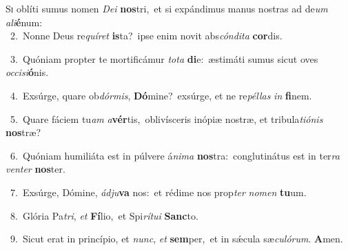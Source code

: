 \lettrine{\initial\textcolor{\initialcolor}{S}}{i} oblíti sumus nomen \textit{De}\-\textit{i} \textbf{nos}\-tri,~\star et si expándimus manus nostras ad de\textit{um} \textit{a}\-\textit{li}\textbf{é}num:\\
{\numbfont\textcolor{\numbcolor}{~2.}}~Nonne Deus re\-\textit{quí}\-\textit{ret} \textbf{is}\-ta?~\star ipse enim novit abs\-\textit{cón}\-\textit{di}\textit{ta} \textbf{cor}\-dis.\par
{\numbfont\textcolor{\numbcolor}{~3.}}~Quóniam propter te mortificámur \textit{to}\-\textit{ta} \textbf{di}\-e:~\star æstimáti sumus sicut oves \textit{oc}\-\textit{ci}\textit{si}\textbf{ó}nis.\par
{\numbfont\textcolor{\numbcolor}{~4.}}~Exsúrge, quare ob\-\textit{dór}\-\textit{mis}, \textbf{Dó}\-mine?~\star exsúrge, et ne re\-\textit{pél}\-\textit{las} \textit{in} \textbf{fi}\-nem.\par
{\numbfont\textcolor{\numbcolor}{~5.}}~Quare fáciem tu\textit{am} \textit{a}\-\textbf{vér}tis,~\star oblivísceris inópiæ nostræ, et tribula\-\textit{ti}\-\textit{ó}\textit{nis} \textbf{nos}\-træ?\par
{\numbfont\textcolor{\numbcolor}{~6.}}~Quóniam humiliáta est in púlvere á\-\textit{ni}\-\textit{ma} \textbf{nos}\-tra:~\star conglutinátus est in ter\textit{ra} \textit{ven}\-\textit{ter} \textbf{nos}\-ter.\par
{\numbfont\textcolor{\numbcolor}{~7.}}~Exsúrge, Dómine, \textit{ád}\-\textit{ju}\textbf{va} nos:~\star et rédime nos prop\textit{ter} \textit{no}\-\textit{men} \textbf{tu}\-um.\par
{\numbfont\textcolor{\numbcolor}{~8.}}~Glória Pa\-\textit{tri}\-, \textit{et} \textbf{Fí}\-lio,~\star et Spi\-\textit{rí}\-\textit{tu}\textit{i} \textbf{Sanc}\-to.\par
{\numbfont\textcolor{\numbcolor}{~9.}}~Sicut erat in princípio, et \textit{nunc}\-, \textit{et} \textbf{sem}\-per,~\star et in sǽcula sæ\-\textit{cu}\-\textit{ló}\textit{rum}. \textbf{A}\-men.\par
